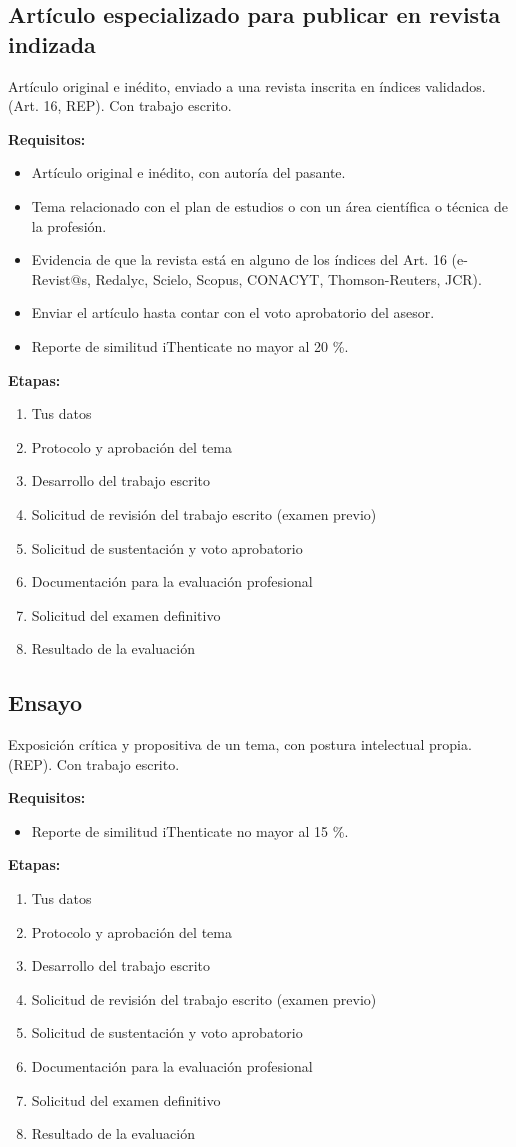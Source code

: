 \subsection{Artículo especializado para publicar en revista indizada}
Artículo original e inédito, enviado a una revista inscrita en índices validados. (Art. 16, REP). Con trabajo escrito.

\textbf{Requisitos:}
\begin{itemize}
  \item Artículo original e inédito, con autoría del pasante.
  \item Tema relacionado con el plan de estudios o con un área científica o técnica de la profesión.
  \item Evidencia de que la revista está en alguno de los índices del Art. 16 (e-Revist@s, Redalyc, Scielo, Scopus, CONACYT, Thomson-Reuters, JCR).
  \item Enviar el artículo hasta contar con el voto aprobatorio del asesor.
  \item Reporte de similitud iThenticate no mayor al 20 \%.
\end{itemize}
\textbf{Etapas:}
\begin{enumerate}
  \item Tus datos
  \item Protocolo y aprobación del tema
  \item Desarrollo del trabajo escrito
  \item Solicitud de revisión del trabajo escrito (examen previo)
  \item Solicitud de sustentación y voto aprobatorio
  \item Documentación para la evaluación profesional
  \item Solicitud del examen definitivo
  \item Resultado de la evaluación
\end{enumerate}
\subsection{Ensayo}
Exposición crítica y propositiva de un tema, con postura intelectual propia. (REP). Con trabajo escrito.

\textbf{Requisitos:}
\begin{itemize}
  \item Reporte de similitud iThenticate no mayor al 15 \%.
\end{itemize}
\textbf{Etapas:}
\begin{enumerate}
  \item Tus datos
  \item Protocolo y aprobación del tema
  \item Desarrollo del trabajo escrito
  \item Solicitud de revisión del trabajo escrito (examen previo)
  \item Solicitud de sustentación y voto aprobatorio
  \item Documentación para la evaluación profesional
  \item Solicitud del examen definitivo
  \item Resultado de la evaluación
\end{enumerate}
